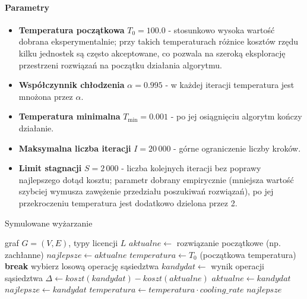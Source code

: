 \paragraph{Parametry}
\begin{itemize}
  \item \textbf{Temperatura początkowa} $T_0 = 100.0$ - stosunkowo wysoka wartość dobrana eksperymentalnie; przy takich temperaturach różnice kosztów rzędu kilku jednostek są często akceptowane, co pozwala na szeroką eksplorację przestrzeni rozwiązań na początku działania algorytmu.
  \item \textbf{Współczynnik chłodzenia} $\alpha = 0.995$ - w każdej iteracji temperatura jest mnożona przez $\alpha$.
  \item \textbf{Temperatura minimalna} $T_{\min} = 0.001$ - po jej osiągnięciu algorytm kończy działanie.
  \item \textbf{Maksymalna liczba iteracji} $I = 20\,000$ - górne ograniczenie liczby kroków.
  \item \textbf{Limit stagnacji} $S = 2\,000$ - liczba kolejnych iteracji bez poprawy najlepszego dotąd kosztu; parametr dobrany empirycznie (mniejsza wartość szybciej wymusza zawężenie przedziału poszukiwań rozwiązań), po jej przekroczeniu temperatura jest dodatkowo dzielona przez 2.
\end{itemize}

\begin{algorithm}[H]
  \caption{Symulowane wyżarzanie}
  \label{alg:sa}
  \begin{algorithmic}[1]
    \Require graf $G=(V,E)$, typy licencji $ L$
    \State $aktualne \gets$ rozwiązanie początkowe (np. zachłanne)
    \State $najlepsze \gets aktualne$
    \State $temperatura \gets T_0$ (początkowa temperatura)
     \textbf{break} \EndIf
    \State wybierz losową operację sąsiedztwa
    \State $kandydat \gets$ wynik operacji sąsiedztwa
    \State $\Delta \gets koszt(kandydat) - koszt(aktualne)$
    \State $aktualne \gets kandydat$
    \State $najlepsze \gets kandydat$
    \EndIf
    \EndIf
    \State $temperatura \gets temperatura \cdot cooling\_rate$
    \EndFor
    \State \Return $najlepsze$
  \end{algorithmic}
\end{algorithm}


